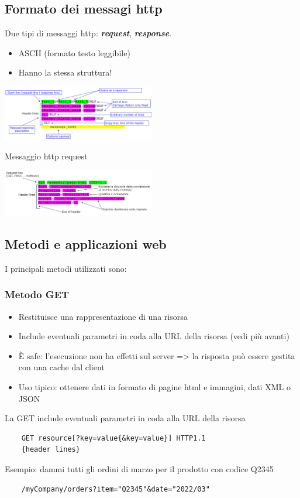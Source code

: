 \subsection{Formato dei messagi http}
Due tipi di messaggi http: \textbf{\textit{request}}, \textbf{\textit{response}}.
\begin{itemize}
    \item ASCII (formato testo leggibile)
    \item Hanno la stessa struttura!
\end{itemize}
\begin{center}
    \includegraphics[width=0.5\textwidth]{img/MOC_messaggi1.jpg}
\end{center}
Messaggio http request
\begin{center}
    \includegraphics[width=0.5\textwidth]{img/MOC_messaggi2.jpg}
\end{center}

\subsection{Metodi e applicazioni web}
I principali metodi utilizzati sono:
\subsubsection{Metodo GET}
\begin{itemize}
    \item Restituisce una rappresentazione di una risorsa
    \item Include eventuali parametri in coda alla URL della risorsa (vedi più avanti)
    \item \`E safe: l'esecuzione non ha effetti sul server => la risposta può essere gestita con una cache dal client
    \item Uso tipico: ottenere dati in formato di pagine html e immagini, dati XML o JSON
\end{itemize}
La GET include eventuali parametri in coda alla URL della risorsa
\begin{verbatim}
    GET resource[?key=value{&key=value}] HTTP1.1
    {header lines}
\end{verbatim}
Esempio: dammi tutti gli ordini di marzo per il prodotto con codice Q2345
\begin{verbatim}
    /myCompany/orders?item="Q2345"&date="2022/03"
\end{verbatim}
